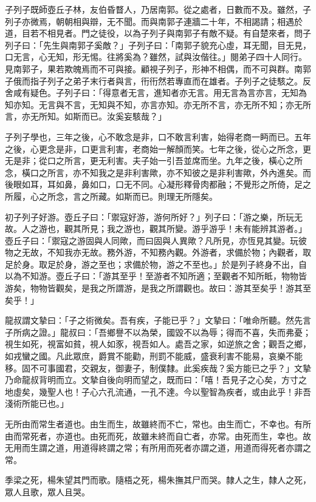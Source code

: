 \begin{pinyinscope}
子列子既師壺丘子林，友伯昏瞀人，乃居南郭。從之處者，日數而不及。雖然，子列子亦微焉，朝朝相與辯，无不聞。而與南郭子連牆二十年，不相謁請；相遇於道，目若不相見者。門之徒役，以為子列子與南郭子有敵不疑。有自楚來者，問子列子曰：「先生與南郭子奚敵？」子列子曰：「南郭子貌充心虛，耳无聞，目无見，口无言，心无知，形无惕。往將奚為？雖然，試與汝偕往。」閱弟子四十人同行。見南郭子，果若欺魄焉而不可與接。顧視子列子，形神不相偶，而不可與群。南郭子俄而指子列子之弟子末行者與言，衎衎然若專直而在雄者。子列子之徒駭之。反舍咸有疑色。子列子曰：「得意者无言，進知者亦无言。用无言為言亦言，无知為知亦知。无言與不言，无知與不知，亦言亦知。亦无所不言，亦无所不知；亦无所言，亦无所知。如斯而已。汝奚妄駭哉？」

子列子學也，三年之後，心不敢念是非，口不敢言利害，始得老商一眄而已。五年之後，心更念是非，口更言利害，老商始一解顏而笑。七年之後，從心之所念，更无是非；從口之所言，更无利害。夫子始一引吾並席而坐。九年之後，橫心之所念，橫口之所言，亦不知我之是非利害歟，亦不知彼之是非利害歟，外內進矣。而後眼如耳，耳如鼻，鼻如口，口无不同。心凝形釋骨肉都融；不覺形之所倚，足之所履，心之所念，言之所藏。如斯而已。則理无所隱矣。

初子列子好游。壺丘子曰：「禦寇好游，游何所好？」列子曰：「游之樂，所玩无故。人之游也，觀其所見；我之游也，觀其所變。游乎游乎！未有能辨其游者。」壺丘子曰：「禦寇之游固與人同歟，而曰固與人異歟？凡所見，亦恆見其變。玩彼物之无故，不知我亦无故。務外游，不知務內觀。外游者，求備於物；內觀者，取足於身。取足於身，游之至也；求備於物，游之不至也。」於是列子終身不出，自以為不知游。壺丘子曰：「游其至乎！至游者不知所適；至觀者不知所眡，物物皆游矣，物物皆觀矣，是我之所謂游，是我之所謂觀也。故曰：游其至矣乎！游其至矣乎！」

龍叔謂文摯曰：「子之術微矣。吾有疾，子能已乎？」文摯曰：「唯命所聽。然先言子所病之證。」龍叔曰：「吾鄉譽不以為榮，國毀不以為辱；得而不喜，失而弗憂；視生如死，視富如貧，視人如豕，視吾如人。處吾之家，如逆旅之舍；觀吾之鄉，如戎蠻之國。凡此眾庶，爵賞不能勸，刑罰不能威，盛衰利害不能易，哀樂不能移。固不可事國君，交親友，御妻子，制僕隸。此奚疾哉？奚方能已之乎？」文摯乃命龍叔背明而立。文摯自後向明而望之，既而曰：「嘻！吾見子之心矣，方寸之地虛矣，幾聖人也！子心六孔流通，一孔不達。今以聖智為疾者，或由此乎！非吾淺術所能已也。」

无所由而常生者道也。由生而生，故雖終而不亡，常也。由生而亡，不幸也。有所由而常死者，亦道也。由死而死，故雖未終而自亡者，亦常。由死而生，幸也。故无用而生謂之道，用道得終謂之常；有所用而死者亦謂之道，用道而得死者亦謂之常。

季梁之死，楊朱望其門而歌。隨梧之死，楊朱撫其尸而哭。隸人之生，隸人之死，眾人且歌，眾人且哭。


\end{pinyinscope}
